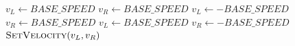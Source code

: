 \documentclass{article}
\begin{document}
\begin{algorithm}
\caption{Simple LiDAR Obstacle Avoidance System}
\begin{algorithmic}[1]
                \State $v_L \gets BASE\_SPEED$
                \State $v_R \gets BASE\_SPEED$
            \Else
                    \State $v_L \gets -BASE\_SPEED$
                    \State $v_R \gets BASE\_SPEED$
                \Else
                    \State $v_L \gets BASE\_SPEED$
                    \State $v_R \gets -BASE\_SPEED$
                \EndIf
            \EndIf
        \State $\textproc{SetVelocity}(v_L, v_R)$
        \EndWhile
    \EndProcedure
\end{algorithmic}
\end{algorithm}
\end{document}
